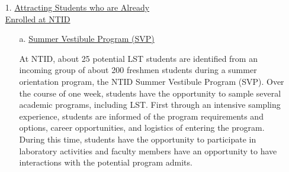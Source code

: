 \documentclass[11.5pt]{sig-alternate} %
\begin{document}
\begin{large}
\begin{itemize}
    \begin{enumerate}
        \item[1.] \underline{Attracting Students who are Already}\\ \underline{Enrolled at NTID} 
        \begin{itemize}
            \item[a.] \underline{Summer Vestibule Program (SVP)}
            \begin{sloppypar}At NTID, about 25 potential LST students are identified from an incoming group of about 200 freshmen students during a summer orientation program, the NTID Summer Vestibule Program (SVP). Over the course of one week, students have the opportunity to sample several academic programs, including LST. First through an intensive sampling experience, students are informed of the program requirements and options, career opportunities, and logistics of entering the program. During this time, students have the opportunity to participate in laboratory activities and faculty members have an opportunity to have interactions with the potential program admits.
            

\end{sloppypar}
\end{itemize}
\end{enumerate}
\end{itemize}
\end{large}
\end{document}
